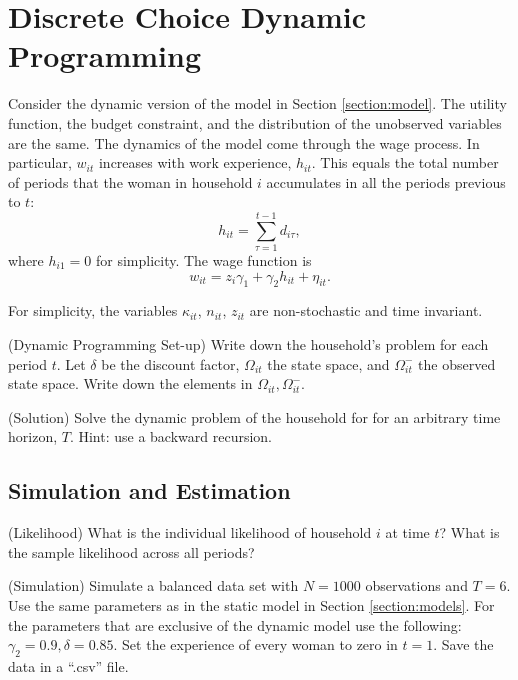 \section{Discrete Choice Dynamic Programming}
Consider the dynamic version of the model in Section \ref{section:model}. The utility function, the budget constraint, and the distribution of the unobserved variables are the same. The dynamics of the model come through the wage process. In particular, $w_{it}$ increases with work experience, $h_{it}$. This equals the total number of periods that the woman in household $i$ accumulates in all the periods previous to $t$:
\begin{equation}
h_{it} = \sum\limits_{\tau=1}^{t-1} d_{i\tau},
\end{equation} 
\noindent where $h_{i1} = 0$ for simplicity. The wage function is
\begin{equation}
w_{it} = z_{i}\gamma_{1} + \gamma_{2}h_{it} + \eta_{it}.
\end{equation} 

\noindent For simplicity, the variables $\kappa_{it}$, $n_{it}$, $z_{it}$ are non-stochastic and time invariant.

\begin{exercise} (Dynamic Programming Set-up)
Write down the household's problem for each period $t$. Let $\delta$ be the discount factor, $\Omega_{it}$ the state space, and $\Omega_{it}^-$ the observed state space. Write down the elements in $\Omega_{it},\Omega_{it}^-$.
\end{exercise}

\begin{exercise} (Solution)
Solve the dynamic problem of the household for for an arbitrary time horizon, $T$. Hint: use a backward recursion.
\end{exercise}

\subsection{Simulation and Estimation}

\begin{exercise} (Likelihood)
What is the individual likelihood of household $i$ at time $t$? What is the sample likelihood across all periods?
\end{exercise}

\begin{exercise} (Simulation) \label{exercise:simulation}
Simulate a balanced data set with $N = 1000$ observations and $T=6$. Use the same parameters as in the static model in Section \ref{section:models}. For the parameters that are exclusive of the dynamic model use the following: $\gamma_2 = 0.9,\delta = 0.85$. Set the experience of every woman to zero in $t=1$. Save the data in a ``.csv'' file.
\end{exercise}

